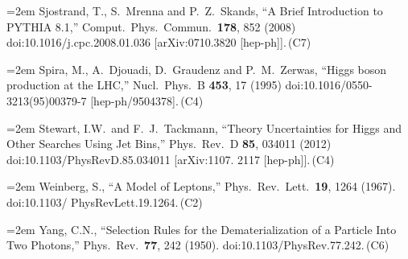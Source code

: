 \documentclass[letter,12pt]{article}
\def\xbibitem#1#2#3{\noindent\hangindent=2em #2\,(#3)}
\begin{document}
\xbibitem{Sjostrand:2007gs}{Sjostrand, T., S.~Mrenna and P.~Z.~Skands,
  ``A Brief Introduction to PYTHIA 8.1,''
  Comput.\ Phys.\ Commun.\  {\bf 178}, 852 (2008)
  doi:10.1016/j.cpc.2008.01.036
  [arXiv:0710.3820 [hep-ph]].}{C7}
 
\xbibitem{Spira:1995rr}{Spira, M., A.~Djouadi, D.~Graudenz and P.~M.~Zerwas,
  ``Higgs boson production at the LHC,''
  Nucl.\ Phys.\ B {\bf 453}, 17 (1995)
  doi:10.1016/0550-3213(95)00379-7
  [hep-ph/9504378].}{C4}
  
\xbibitem{Stewart:2011cf}{Stewart, I.W.\ and F.~J.~Tackmann,
  ``Theory Uncertainties for Higgs and Other Searches Using Jet Bins,''
  Phys.\ Rev.\ D {\bf 85}, 034011 (2012)
  doi:10.1103/PhysRevD.85.034011
  [arXiv:1107. 2117 [hep-ph]].}{C4}

\xbibitem{Weinberg:1967tq}{Weinberg, S.,
  ``A Model of Leptons,''
  Phys.\ Rev.\ Lett.\  {\bf 19}, 1264 (1967).
  doi:10.1103/ PhysRevLett.19.1264.}{C2}
  
\xbibitem{Yang:1950rg}{Yang, C.N.,
  ``Selection Rules for the Dematerialization of a Particle Into Two Photons,''
  Phys.\ Rev.\  {\bf 77}, 242 (1950).
  doi:10.1103/PhysRev.77.242.}{C6}


\end{document}
